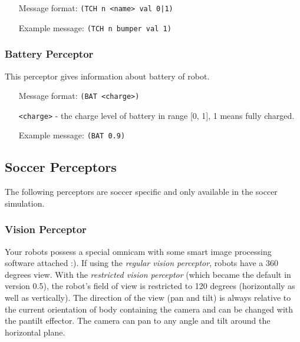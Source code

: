 \begin{itemize}
	\item[Message format:] \texttt{(TCH n <name> val 0|1)}
	\item[Example message:] \texttt{(TCH n bumper val 1)}
\end{itemize}


\subsubsection{Battery Perceptor}
\label{sec:batteryperceptor}
This perceptor gives information about battery of robot.

\begin{itemize}
	\item[Message format:] \texttt{(BAT <charge>)}
        \item[\texttt{<charge>} -] the charge level of battery in range [0, 1], 1 means fully charged.
	\item[Example message:] \texttt{(BAT 0.9)}
\end{itemize}


\subsection{Soccer Perceptors}
\label{sec:soccerperceptors}
The following perceptors are soccer specific and only available in the soccer
simulation.



\subsubsection{Vision Perceptor}
\label{sec:visionperceptor}
Your robots possess a special omnicam with some smart image processing software
attached :). If using the \emph{regular vision perceptor}, robots have a 360
degrees view. With the \emph{restricted vision perceptor} (which became the
default in version 0.5), the robot's field of view is restricted to 120 degrees
(horizontally as well as vertically). The direction of the view (pan and tilt)
is always relative to the current orientation of body containing the camera and
can be changed with the pantilt effector. The camera can pan to any angle and
tilt around the horizontal plane.

